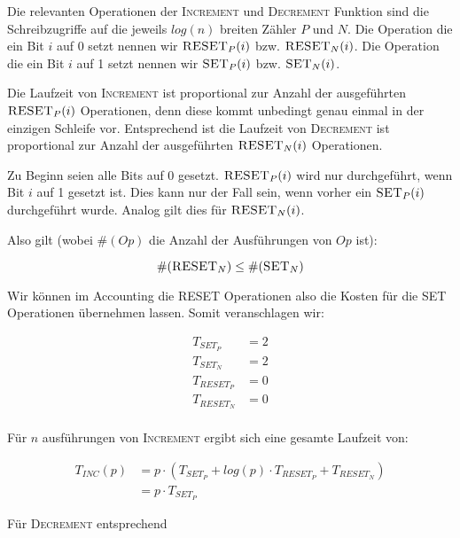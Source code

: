 \documentclass[parskip=half,a4paper]{scrartcl}
\begin{document}
Die relevanten Operationen der \textsc{Increment} und \textsc{Decrement} Funktion sind die Schreibzugriffe auf die jeweils $log(n)$ breiten Zähler $P$ und $N$. Die Operation die ein Bit $i$ auf 0 setzt nennen wir $\textsc{RESET}_P(i)$ bzw. $\textsc{RESET}_N(i)$. Die Operation die ein Bit $i$ auf 1 setzt nennen wir $\textsc{SET}_P(i)$ bzw. $\textsc{SET}_N(i)$.

Die Laufzeit von \textsc{Increment} ist proportional zur Anzahl der ausgeführten $\textsc{RESET}_P(i)$ Operationen, denn diese kommt unbedingt genau einmal in der einzigen Schleife vor. Entsprechend ist die Laufzeit von \textsc{Decrement} ist proportional zur Anzahl der ausgeführten $\textsc{RESET}_N(i)$ Operationen.

Zu Beginn seien alle Bits auf 0 gesetzt. $\textsc{RESET}_P(i)$ wird nur durchgeführt, wenn Bit $i$ auf 1 gesetzt ist. Dies kann nur der Fall sein, wenn vorher ein $\textsc{SET}_P(i)$ durchgeführt wurde. Analog gilt dies für $\textsc{RESET}_N(i)$.

Also gilt (wobei $\#(\textit{Op})$ die Anzahl der Ausführungen von $\textit{Op}$ ist):

\begin{equation}
\#(\textsc{RESET}_N) \le \#(\textsc{SET}_N)
\end{equation}

Wir können im Accounting die \textsc{RESET} Operationen also die Kosten für die \textsc{SET} Operationen übernehmen lassen. Somit veranschlagen wir:

\begin{equation}
\begin{aligned}
T_{SET_P} &= 2 \\
T_{SET_N} &= 2 \\
T_{RESET_P} &= 0 \\
T_{RESET_N} &= 0 \\
\end{aligned}
\end{equation}

Für $n$ ausführungen von \textsc{Increment} ergibt sich eine gesamte Laufzeit von:

\begin{equation}
\begin{aligned}
T_{INC}(p) &= p \cdot (T_{SET_P} + log(p) \cdot T_{RESET_P} + T_{RESET_N}) \\
 &= p \cdot T_{SET_P}
\end{aligned}
\end{equation}

Für \textsc{Decrement} entsprechend
\end{document}
